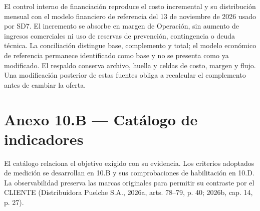 El control interno de financiación reproduce el costo incremental y su distribución mensual con el modelo financiero de referencia del 13 de noviembre de 2026 usado por SD7. El incremento se absorbe en margen de Operación, sin aumento de ingresos comerciales ni uso de reservas de prevención, contingencia o deuda técnica. La conciliación distingue base, complemento y total; el modelo económico de referencia permanece identificado como base y no se presenta como ya modificado. El respaldo conserva archivo, huella y celdas de costo, margen y flujo. Una modificación posterior de estas fuentes obliga a recalcular el complemento antes de cambiar la oferta.

\Needspace{0.82\textheight}
\section*{Anexo 10.B — Catálogo de indicadores}
\label{anx:sd10-indicadores}

El catálogo relaciona el objetivo exigido con su evidencia. Los criterios adoptados de medición se desarrollan en 10.B y sus comprobaciones de habilitación en 10.D. La observabilidad preserva las marcas originales para permitir su contraste por el CLIENTE (Distribuidora Puelche S.A., 2026a, arts. 78--79, p. 40; 2026b, cap. 14, p. 27).

